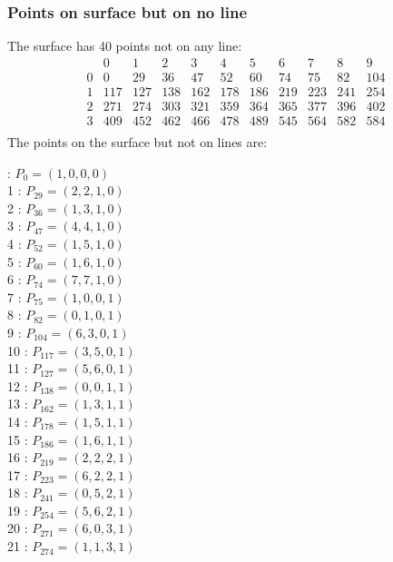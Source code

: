 \documentclass{article}
\begin{document}
{\subsubsection*{Points on surface but on no line}
The surface has 40 points not on any line:\\
$$
\begin{array}{r|*{10}{r}}
 & 0 & 1 & 2 & 3 & 4 & 5 & 6 & 7 & 8 & 9\\
\hline
0 & 0 & 29 & 36 & 47 & 52 & 60 & 74 & 75 & 82 & 104\\
1 & 117 & 127 & 138 & 162 & 178 & 186 & 219 & 223 & 241 & 254\\
2 & 271 & 274 & 303 & 321 & 359 & 364 & 365 & 377 & 396 & 402\\
3 & 409 & 452 & 462 & 466 & 478 & 489 & 545 & 564 & 582 & 584\\
\end{array}
$$
The points on the surface but not on lines are:\\
\begin{multicols}{2}
 : $P_{0}=( 1, 0, 0, 0 )$\\
1 : $P_{29}=( 2, 2, 1, 0 )$\\
2 : $P_{36}=( 1, 3, 1, 0 )$\\
3 : $P_{47}=( 4, 4, 1, 0 )$\\
4 : $P_{52}=( 1, 5, 1, 0 )$\\
5 : $P_{60}=( 1, 6, 1, 0 )$\\
6 : $P_{74}=( 7, 7, 1, 0 )$\\
7 : $P_{75}=( 1, 0, 0, 1 )$\\
8 : $P_{82}=( 0, 1, 0, 1 )$\\
9 : $P_{104}=( 6, 3, 0, 1 )$\\
10 : $P_{117}=( 3, 5, 0, 1 )$\\
11 : $P_{127}=( 5, 6, 0, 1 )$\\
12 : $P_{138}=( 0, 0, 1, 1 )$\\
13 : $P_{162}=( 1, 3, 1, 1 )$\\
14 : $P_{178}=( 1, 5, 1, 1 )$\\
15 : $P_{186}=( 1, 6, 1, 1 )$\\
16 : $P_{219}=( 2, 2, 2, 1 )$\\
17 : $P_{223}=( 6, 2, 2, 1 )$\\
18 : $P_{241}=( 0, 5, 2, 1 )$\\
19 : $P_{254}=( 5, 6, 2, 1 )$\\
20 : $P_{271}=( 6, 0, 3, 1 )$\\
21 : $P_{274}=( 1, 1, 3, 1 )$\\

\end{multicols}}
\end{document}
